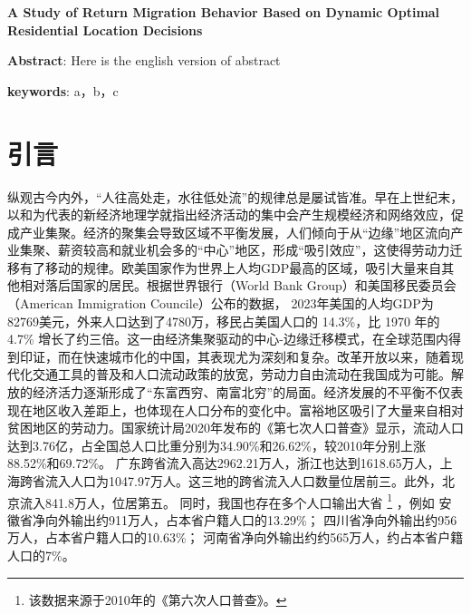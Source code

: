 \documentclass[
  a4paper,
  zihao=-4,
  fontset=mac,
  AutoFakeBold,
  AutoFakeSlant,
  oneside]{ctexbook}
\let\oldfootnote\footnote
\renewcommand{\footnote}[1]{%
  \oldfootnote{\setstretch{1.5}#1}%
}
\begin{document}
\begin{center}
    {
    \textbf{A Study of Return Migration Behavior Based on Dynamic Optimal Residential Location Decisions}
    }
\end{center}

{
\textbf{Abstract}: Here is the english version of abstract

\textbf{keywords}: a，b，c
}



\frontmatter
\renewcommand{\thepage}{\Roman{page}} %

%

\newpage
\tableofcontents
\thispagestyle{empty}

\mainmatter
\newpage
\chapter{引言}

纵观古今内外，“人往高处走，水往低处流”的规律总是屡试皆准。早在上世纪末，以\textcite{krugmanIncreasingReturnsEconomic1991}和\textcite{fujitaSpatialEconomyCities1999}为代表的新经济地理学就指出经济活动的集中会产生规模经济和网络效应，促成产业集聚。经济的聚集会导致区域不平衡发展，人们倾向于从“边缘”地区流向产业集聚、薪资较高和就业机会多的“中心”地区，形成“吸引效应”，这使得劳动力迁移有了移动的规律。欧美国家作为世界上人均GDP最高的区域，吸引大量来自其他相对落后国家的居民。根据世界银行（World Bank Group）和美国移民委员会（American Immigration Councile）公布的数据，
2023年美国的人均GDP为82769美元，外来人口达到了4780万，移民占美国人口的 14.3\%，比 1970 年的 4.7\% 增长了约三倍。这一由经济集聚驱动的中心-边缘迁移模式，在全球范围内得到印证，而在快速城市化的中国，其表现尤为深刻和复杂。改革开放以来，随着现代化交通工具的普及和人口流动政策的放宽，劳动力自由流动在我国成为可能。解放的经济活力逐渐形成了“东富西穷、南富北穷”的局面。经济发展的不平衡不仅表现在地区收入差距上，也体现在人口分布的变化中。富裕地区吸引了大量来自相对贫困地区的劳动力。国家统计局2020年发布的《第七次人口普查》显示，流动人口达到3.76亿，占全国总人口比重分别为34.90\%和26.62\%，较2010年分别上涨88.52\%和69.72\%。
广东跨省流入高达2962.21万人，浙江也达到1618.65万人，上海跨省流入人口为1047.97万人。这三地的跨省流入人口数量位居前三。此外，北京流入841.8万人，位居第五。
同时，我国也存在多个人口输出大省\footnote{该数据来源于2010年的《第六次人口普查》。}，例如
安徽省净向外输出约911万人，占本省户籍人口的13.29\%；
四川省净向外输出约956 万人，占本省户籍人口的10.63\%；
河南省净向外输出约约565万人，约占本省户籍人口的7\%。
\end{document}
